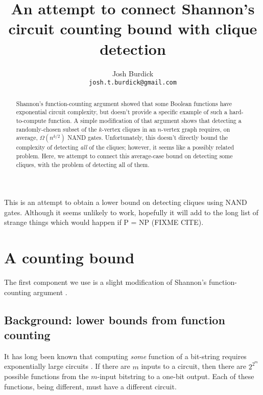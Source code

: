 \documentclass[12pt]{article}
\theoremstyle{definition}
\begin{document}
\title{
An attempt to connect Shannon's
circuit counting bound with clique detection}

\author{Josh Burdick \\
{\tt josh.t.burdick@gmail.com}}
\maketitle

\begin{abstract}
Shannon's function-counting argument
\cite{shannon_synthesis_1949} showed that some Boolean functions have
exponential circuit complexity, but doesn't provide a specific example
of such a hard-to-compute function. A simple modification of that argument
shows that detecting a randomly-chosen subset of the $k$-vertex cliques in an
$n$-vertex graph requires, on average, $\Omega(n^{k/2})$ NAND gates.
Unfortunately,
this doesn't directly bound the complexity of detecting {\em all} of the cliques; however, it seems like a
possibly related problem.
Here, we attempt to connect this
average-case bound on detecting some
cliques, with the problem of detecting all of them.
\end{abstract}

\newpage

\tableofcontents

This is an attempt to obtain a lower bound on detecting cliques
using NAND gates. Although it seems unlikely to work, hopefully
it will add to the long list of strange things which would happen
if P = NP (FIXME CITE).

\section{A counting bound}
\label{countingBound}

The first component we use is a slight modification
of Shannon's function-counting argument
\cite{shannon_synthesis_1949}.

\subsection{Background: lower bounds from function counting}

It has long been known that computing {\em some} function of a bit-string
requires exponentially large circuits \cite{shannon_synthesis_1949}.
If there are $m$ inputs to a circuit,
then there are $2^{2^m}$ possible functions from the $m$-input bitstring to
a one-bit output. Each of these functions, being different, must have a
different circuit.
\end{document}

